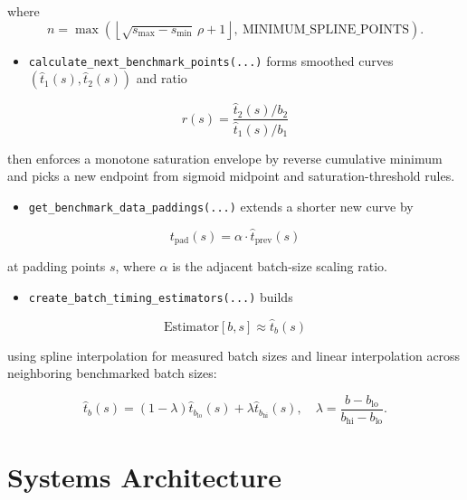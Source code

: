 \documentclass{article}
\providecommand{\tightlist}{\setlength{\itemsep}{0pt}\setlength{\parskip}{0pt}}
\begin{document}
where
\[
n=\max\!\left(\left\lfloor\sqrt{s_{\max}-s_{\min}}\,\rho +1\right\rfloor,\ \text{MINIMUM\_SPLINE\_POINTS}\right).
\]

\begin{itemize}
\tightlist
\item
  \texttt{calculate\_next\_benchmark\_points(...)} forms smoothed curves
  \((\hat{t}_1(s),\hat{t}_2(s))\) and
  ratio
\end{itemize}

\begin{equation}
r(s)=\frac{\hat{t}_2(s)/b_2}{\hat{t}_1(s)/b_1}
\end{equation}

then enforces a monotone saturation envelope by reverse cumulative
minimum and picks a new endpoint from sigmoid midpoint and
saturation-threshold rules.

\begin{itemize}
\tightlist
\item
  \texttt{get\_benchmark\_data\_paddings(...)} extends a shorter new
  curve by
\end{itemize}

\begin{equation}
t_{\mathrm{pad}}(s)=\alpha\cdot \hat{t}_{\mathrm{prev}}(s)
\end{equation}

at padding points \(s\), where \(\alpha\) is the adjacent
batch-size scaling ratio.

\begin{itemize}
\tightlist
\item
  \texttt{create\_batch\_timing\_estimators(...)} builds
\end{itemize}

\begin{equation}
\mathrm{Estimator}[b,s]\approx \hat{t}_b(s)
\end{equation}

using spline interpolation for measured batch sizes and linear
interpolation across neighboring benchmarked batch sizes:

\begin{equation}
\hat{t}_{b}(s)=(1-\lambda)\hat{t}_{b_{\mathrm{lo}}}(s)+\lambda\hat{t}_{b_{\mathrm{hi}}}(s),\quad
\lambda=\frac{b-b_{\mathrm{lo}}}{b_{\mathrm{hi}}-b_{\mathrm{lo}}}.
\end{equation}

\hypertarget{6-systems-architecture}{%
\section{Systems Architecture}\label{6-systems-architecture}}
\end{document}
